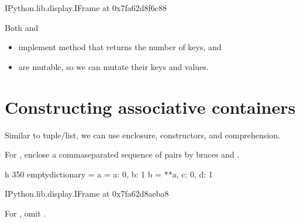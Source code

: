 \documentclass[letterpaper,10pt,english]{sphinxmanual}
\begin{document}
\begin{sphinxVerbatim}[commandchars=\\\{\}]
\PYGZlt{}IPython.lib.display.IFrame at 0x7fa62d8f6c88\PYGZgt{}
\end{sphinxVerbatim}

Both  and 
\begin{itemize}
\item {} 
implement  method that returns the number of keys, and

\item {} 
are mutable, so we can mutate their keys and values.

\end{itemize}


\section{Constructing associative containers}
\label{\detokenize{Lecture8/Dictionaries and Sets:constructing-associative-containers}}

Similar to tuple/list, we can use enclosure, constructors, and comprehension.


For , enclose a comma\sphinxhyphen{}separated sequence of  pairs by braces \sphinxcode{\sphinxupquote{\{}} and \sphinxcode{\sphinxupquote{\}}}.

\begin{sphinxVerbatim}[commandchars=\\\{\}]
 \PYGZhy{}h 350
empty\PYGZus{}dictionary = \PYGZob{}\PYGZcb{}
a = \PYGZob{}\PYGZsq{}a\PYGZsq{}: 0, \PYGZsq{}b\PYGZsq{}: 1\PYGZcb{}
b = \PYGZob{}**a, \PYGZsq{}c\PYGZsq{}: 0, \PYGZsq{}d\PYGZsq{}: 1\PYGZcb{}
\end{sphinxVerbatim}

\begin{sphinxVerbatim}[commandchars=\\\{\}]
\PYGZlt{}IPython.lib.display.IFrame at 0x7fa62d8aeba8\PYGZgt{}
\end{sphinxVerbatim}

For , omit .
\end{document}
